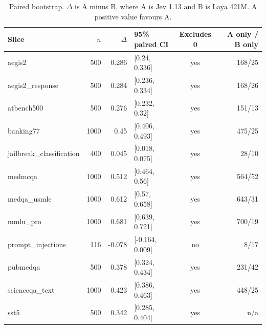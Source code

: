 \begin{table}[t]
\centering
\caption{Paired bootstrap. $\Delta$ is A minus B, where A is Jev 1.13 and B is Laya 421M. A positive value favours A.}
\small
\begin{tabular}{lrrlcr}
\toprule
Slice & $n$ & $\Delta$ & 95\% paired CI & Excludes 0 & A only / B only \\
\midrule
  aegis2 & 500 & 0.286 & [0.24, 0.336] & yes & 168/25 \\
  aegis2\_response & 500 & 0.284 & [0.236, 0.334] & yes & 168/26 \\
  atbench500 & 500 & 0.276 & [0.232, 0.32] & yes & 151/13 \\
  banking77 & 1000 & 0.45 & [0.406, 0.493] & yes & 475/25 \\
  jailbreak\_classification & 400 & 0.045 & [0.018, 0.075] & yes & 28/10 \\
  medmcqa & 1000 & 0.512 & [0.464, 0.56] & yes & 564/52 \\
  medqa\_usmle & 1000 & 0.612 & [0.57, 0.658] & yes & 643/31 \\
  mmlu\_pro & 1000 & 0.681 & [0.639, 0.721] & yes & 700/19 \\
  prompt\_injections & 116 & -0.078 & [-0.164, 0.009] & no & 8/17 \\
  pubmedqa & 500 & 0.378 & [0.324, 0.434] & yes & 231/42 \\
  scienceqa\_text & 1000 & 0.423 & [0.386, 0.463] & yes & 448/25 \\
  sst5 & 500 & 0.342 & [0.285, 0.404] & yes & n/a \\
\bottomrule
\end{tabular}
\end{table}

